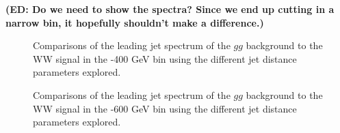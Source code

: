 {\bf (ED: Do we need to show the \pt spectra? Since we end up cutting in a narrow bin, it hopefully shouldn't make a difference.)}

\begin{figure}
\begin{center}
\caption{Comparisons of the leading jet \pt spectrum of the $gg$
  background to the WW signal in the -400 GeV bin using the
  different \antikt jet distance parameters explored.}
\label{fig:pt300_basics}
\end{center}
\end{figure}

\begin{figure}
\begin{center}
\caption{Comparisons of the leading jet \pt spectrum of the $gg$
  background to the WW signal in the -600 GeV bin using the
  different \antikt jet distance parameters explored.}
\label{fig:pt500_basics}
\end{center}
\end{figure}

